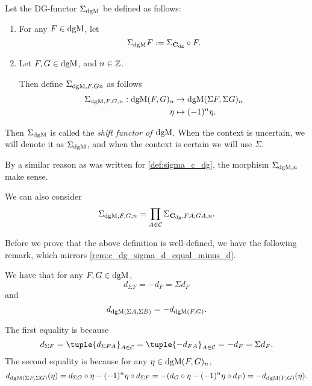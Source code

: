 \begin{definition}
    \label{def:sigma_dgmod}
    Let the DG-functor \( \Sigma_{\operatorname{dgM}} \) be defined as follows:
    \begin{enumerate}
        \item {
            For any \( F \in \operatorname{dgM} \), let
            \[
                \Sigma_{\operatorname{dgM}} F := \Sigma_{\operatorname{\mathbf{C}}_{\operatorname{dg}}} \circ F.
            \]
        }
        \item {
            Let \( F, G \in \operatorname{dgM} \), and \( n \in {\mathbb{Z}} \).
            
            Then define \( \Sigma_{\operatorname{dgM}, F, G n} \) as follows
            \begin{align*}
                \Sigma_{\operatorname{dgM}, F, G, n}: \operatorname{dgM}(F, G)_n &\to \operatorname{dgM}(\Sigma F, \Sigma G)_n \\
                \eta &\mapsto (-1)^n \eta.
            \end{align*}
        }
    \end{enumerate}
    Then \( \Sigma_{\operatorname{dgM}} \) is called the \emph{shift functor of \( \operatorname{dgM} \)}. When the context is uncertain, we will denote it as \( \Sigma_{\operatorname{dgM}} \), and when the context is certain we will use \( \Sigma \).
\end{definition}

By a similar reason as was written for \autoref{def:sigma_c_dg}, the morphism \( \Sigma_{\operatorname{dgM}, n} \) make sense.

We can also consider
\[
    \Sigma_{\operatorname{dgM}, F, G, n} = \prod_{A \in {\mathcal{C}}} \Sigma_{\operatorname{\mathbf{C}}_{\operatorname{dg}}, F A, G A, n}.
\] 

Before we prove that the above definition is well-defined, we have the following remark, which mirrors \autoref{rem:c_dg_sigma_d_equal_minus_d}.

\begin{remark}
    We have that for any \( F, G \in \operatorname{dgM} \),
    \[
        d_{\Sigma F} = -d_F = \Sigma d_F
    \]
    and
    \[
        d_{\operatorname{dgM}(\Sigma A, \Sigma B)} = - d_{\operatorname{dgM}(F, G)}.
    \]

    The first equality is because
    \[
        d_{\Sigma F} = \tuple{d_{\Sigma F A}}_{A \in \Cc} = \tuple{-d_{F A}}_{A \in \Cc} = - d_F = \Sigma d_F.
    \]
    The second equality is because for any \( \eta \in \operatorname{dgM}(F, G)_n \),
    \[
        d_{\operatorname{dgM}(\Sigma F, \Sigma G)} (\eta) = d_{\Sigma G} \circ \eta - (-1)^n \eta \circ d_{\Sigma F} = - (d_G \circ \eta - (-1)^n \eta \circ d_F) = - d_{\operatorname{dgM}(F, G)} (\eta).
    \]
\end{remark}


